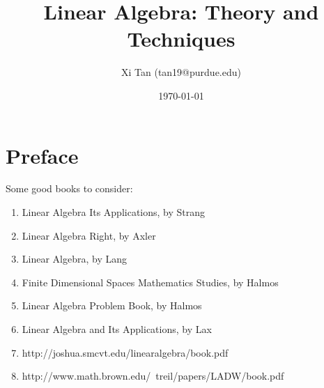 \documentclass{book}
\title{Linear Algebra: Theory and Techniques}
\author{Xi Tan (tan19@purdue.edu)}
\date{\today}
\begin{document}
\maketitle
\tableofcontents
\newpage

\section*{Preface}
Some good books to consider:
\begin{enumerate}
	\item Linear Algebra Its Applications, by Strang
	\item Linear Algebra Right, by Axler
	\item Linear Algebra, by Lang
	\item Finite Dimensional Spaces Mathematics Studies, by Halmos
	\item Linear Algebra Problem Book, by Halmos
	\item Linear Algebra and Its Applications, by Lax
	\item http://joshua.smcvt.edu/linearalgebra/book.pdf
	\item http://www.math.brown.edu/~treil/papers/LADW/book.pdf
\end{enumerate}

\newpage




\end{document}

